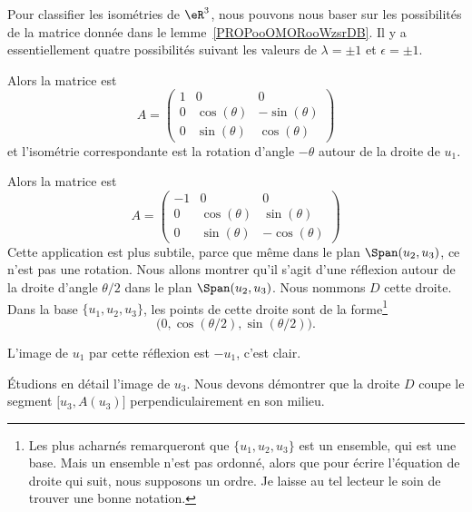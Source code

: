 Pour classifier les isométries de \( \eR^3\), nous pouvons nous baser sur les possibilités de la matrice donnée dans le lemme~\ref{PROPooOMORooWzsrDB}. Il y a essentiellement quatre possibilités suivant les valeurs de \( \lambda=\pm 1\) et \( \epsilon=\pm 1\).

\begin{subproof}
	\spitem[Si \( \epsilon=\lambda=1\)] Alors la matrice est
	\begin{equation}
		A=\begin{pmatrix}
			1 & 0            & 0             \\
			0 & \cos(\theta) & -\sin(\theta) \\
			0 & \sin(\theta) & \cos(\theta)
		\end{pmatrix}
	\end{equation}
	et l'isométrie correspondante est la rotation d'angle \( -\theta\) autour de la droite de \( u_1\).

	\spitem[Si \( \epsilon=\lambda=-1\)]
	Alors la matrice est
	\begin{equation}
		A=\begin{pmatrix}
			-1 & 0            & 0             \\
			0  & \cos(\theta) & \sin(\theta)  \\
			0  & \sin(\theta) & -\cos(\theta)
		\end{pmatrix}
	\end{equation}
	Cette application est plus subtile, parce que même dans le plan \( \Span(u_2,u_3)\), ce n'est pas une rotation. Nous allons montrer qu'il s'agit d'une réflexion autour de la droite d'angle \( \theta/2\) dans le plan \( \Span(u_2,u_3)\). Nous nommons \( D\) cette droite. Dans la base \( \{ u_1,u_2,u_3 \}\), les points de cette droite sont de la forme\footnote{Les plus acharnés remarqueront que \( \{ u_1,u_2,u_3 \}\) est un ensemble, qui est une base. Mais un ensemble n'est pas ordonné, alors que pour écrire l'équation de droite qui suit, nous supposons un ordre. Je laisse au tel lecteur le soin de trouver une bonne notation.}
	\begin{equation}
		\big( 0,\cos(\theta/2),\sin(\theta/2) \big).
	\end{equation}

	L'image de \( u_1\) par cette réflexion est \(-u_1\), c'est clair.

	Étudions en détail l'image de \( u_3\). Nous devons démontrer que la droite \( D\) coupe le segment \( \mathopen[ u_3 , A(u_3) \mathclose]\) perpendiculairement en son milieu.


\end{subproof}
